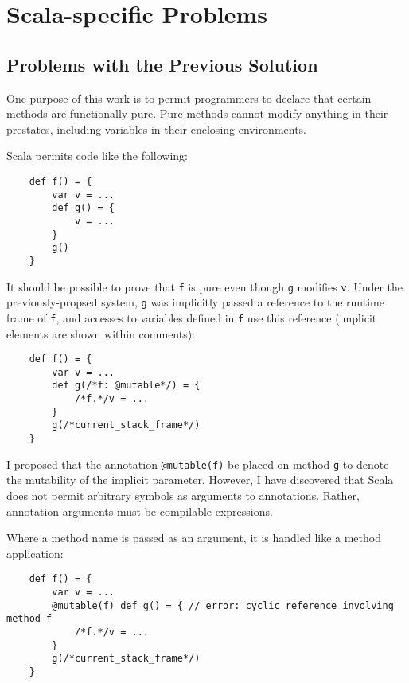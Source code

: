 \documentclass[letterpaper,11pt]{article}
\newcommand{\code}[1]{\lstinline$#1$}
\begin{document}
\def\redcolor{\color{red}}
\def\greencolor{\color{green!60!black}}
\def\bluecolor{\color{blue}}
\def\blackcolor{\color{black}}




\section{Scala-specific Problems}


\subsection{Problems with the Previous Solution}

One purpose of this work is to permit programmers to declare that certain methods are
functionally pure.
Pure methods cannot modify anything in their prestates, including variables in
their enclosing environments.

Scala permits code like the following:

\begin{lstlisting}
	def f() = {
		var v = ...
		def g() = {
			v = ...
		}
		g()
	}
\end{lstlisting}

It should be possible to prove that \code{f} is pure
even though \code{g} modifies \code{v}.
Under the previously-propsed system, \code{g} was implicitly passed a reference to the runtime frame of \code{f},
and accesses to variables defined in \code{f} use this reference (implicit elements are shown within comments):

\begin{lstlisting}
	def f() = {
		var v = ...
		def g(/*f: @mutable*/) = {
			/*f.*/v = ...
		}
		g(/*current_stack_frame*/)
	}
\end{lstlisting}

I proposed that the annotation \code{@mutable(f)} be placed on method \code{g} to denote the
mutability of the implicit parameter.
However, I have discovered that Scala does not permit arbitrary symbols as arguments to annotations.
Rather, annotation arguments must be compilable expressions.

Where a method name is passed as an argument,
it is handled like a method application:

\begin{lstlisting}
	def f() = {
		var v = ...
		@mutable(f) def g() = { // error: cyclic reference involving method f
			/*f.*/v = ...
		}
		g(/*current_stack_frame*/)
	}
\end{lstlisting}
\end{document}
